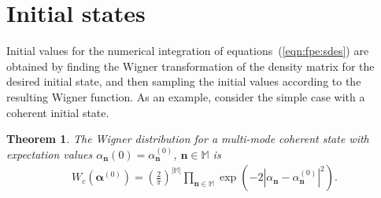 \documentclass[12pt,aip,jmp,amssymb,amsmath]{revtex4-1}
\newtheorem{theorem}{Theorem}
\begin{document}
\section{Initial states}

Initial values for the numerical integration of equations~(\ref{eqn:fpe:sdes}) are obtained by finding the Wigner transformation of the density matrix for the desired initial state, and then sampling the initial values according to the resulting Wigner function.
As an example, consider the simple case with a coherent initial state.

\begin{theorem}
    The Wigner distribution for a multi-mode coherent state with expectation values
    $\alpha_{\boldsymbol{n}}(0) = \alpha_{\boldsymbol{n}}^{(0)}$, $\boldsymbol{n} \in \mathbb{M}$ is
    \begin{eqnarray*}
        W_c (\boldsymbol{\alpha}^{(0)})
        = \left( \frac{2}{\pi} \right)^{|\mathbb{M}|} \prod_{\boldsymbol{n} \in \mathbb{M}}
            \exp(-2 |\alpha_{\boldsymbol{n}} - \alpha_{\boldsymbol{n}}^{(0)}|^2).
    \end{eqnarray*}
\end{theorem}
\end{document}
